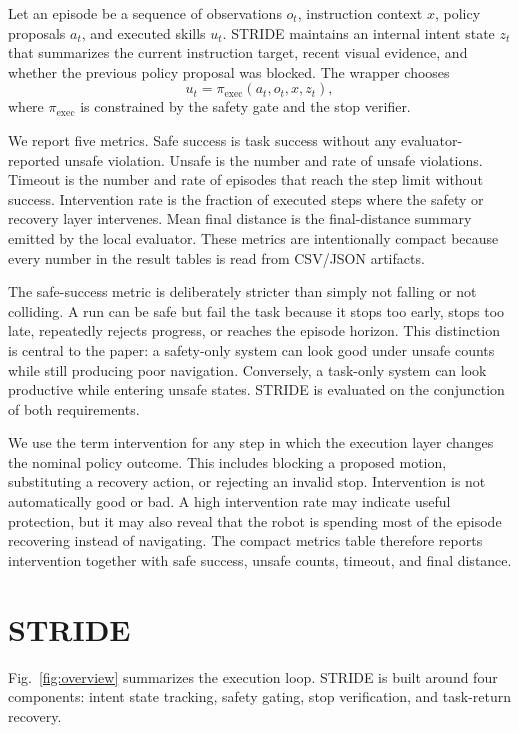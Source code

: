 \documentclass[letterpaper,10pt,conference]{ieeeconf}
\begin{document}
Let an episode be a sequence of observations $o_t$, instruction context $x$, policy proposals $a_t$, and executed skills $u_t$. STRIDE maintains an internal intent state $z_t$ that summarizes the current instruction target, recent visual evidence, and whether the previous policy proposal was blocked. The wrapper chooses
\begin{equation}
    u_t = \pi_{\mathrm{exec}}(a_t, o_t, x, z_t),
\end{equation}
where $\pi_{\mathrm{exec}}$ is constrained by the safety gate and the stop verifier.

We report five metrics. Safe success is task success without any evaluator-reported unsafe violation. Unsafe is the number and rate of unsafe violations. Timeout is the number and rate of episodes that reach the step limit without success. Intervention rate is the fraction of executed steps where the safety or recovery layer intervenes. Mean final distance is the final-distance summary emitted by the local evaluator. These metrics are intentionally compact because every number in the result tables is read from CSV/JSON artifacts.

The safe-success metric is deliberately stricter than simply not falling or not colliding. A run can be safe but fail the task because it stops too early, stops too late, repeatedly rejects progress, or reaches the episode horizon. This distinction is central to the paper: a safety-only system can look good under unsafe counts while still producing poor navigation. Conversely, a task-only system can look productive while entering unsafe states. STRIDE is evaluated on the conjunction of both requirements.

We use the term intervention for any step in which the execution layer changes the nominal policy outcome. This includes blocking a proposed motion, substituting a recovery action, or rejecting an invalid stop. Intervention is not automatically good or bad. A high intervention rate may indicate useful protection, but it may also reveal that the robot is spending most of the episode recovering instead of navigating. The compact metrics table therefore reports intervention together with safe success, unsafe counts, timeout, and final distance.

\section{STRIDE}
Fig.~\ref{fig:overview} summarizes the execution loop. STRIDE is built around four components: intent state tracking, safety gating, stop verification, and task-return recovery.
\end{document}
